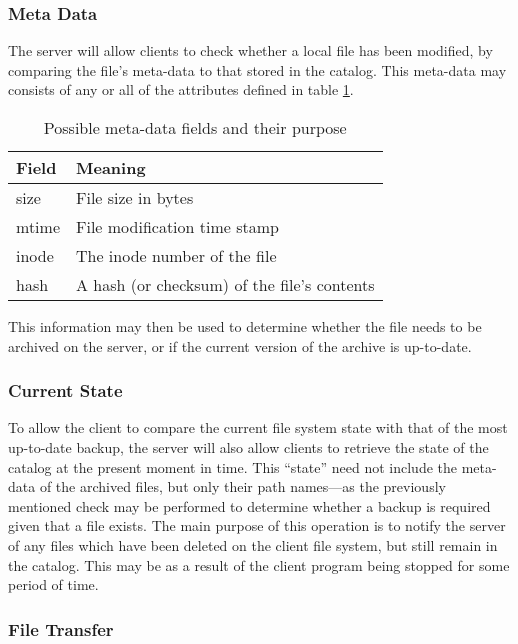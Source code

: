 \subsubsection{Meta Data}

The server will allow clients to check whether a local file has been modified,
by comparing the file's meta-data to that stored in the catalog. This meta-data
may consists of any or all of the attributes defined in table
\ref{tab:meta-data}.

\begin{table}[h]
    \centering
    \begin{tabular}{ l l }
        \toprule
        Field       & Meaning
        \\ \midrule
        size        & File size in bytes
        \\
        mtime       & File modification time stamp
        \\
        inode       & The inode number of the file
        \\
        hash        & A hash (or checksum) of the file's contents
        \\ \bottomrule
    \end{tabular}
    \caption{Possible meta-data fields and their purpose}
    \label{tab:meta-data}
\end{table}

This information may then be used to determine whether the file needs to be
archived on the server, or if the current version of the archive is up-to-date.

\subsubsection{Current State}

To allow the client to compare the current file system state with that of the
most up-to-date backup, the server will also allow clients to retrieve the
state of the catalog at the present moment in time. This ``state'' need not
include the meta-data of the archived files, but only their path names---as the
previously mentioned check may be performed to determine whether a backup is
required given that a file exists. The main purpose of this operation is to
notify the server of any files which have been deleted on the client file
system, but still remain in the catalog. This may be as a result of the client
program being stopped for some period of time.

\subsubsection{File Transfer}

